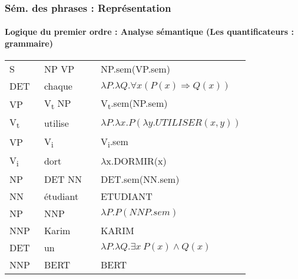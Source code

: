 \documentclass[xcolor=table]{beamer}
\begin{document}
\begin{frame}
	\frametitle{Sém. des phrases : Représentation}
	\framesubtitle{Logique du premier ordre : Analyse sémantique (Les quantificateurs : grammaire)}
	
	\begin{center}
		\small\bfseries
		\begin{tabular}{llll}
			\hline\hline
			S  & \textrightarrow\ NP VP && NP.sem(VP.sem) \\
			DET & \textrightarrow\ chaque && $\lambda P.\lambda Q.\forall x (P(x) \Rightarrow Q(x))$ \\
			
			VP & \textrightarrow\ V\textsubscript{t} NP && V\textsubscript{t}.sem(NP.sem) \\
			V\textsubscript{t}  & \textrightarrow\ utilise && $\lambda P.\lambda x.P(\lambda y.UTILISER(x, y))$ \\
			
			VP & \textrightarrow\ V\textsubscript{i} && V\textsubscript{i}.sem \\
			V\textsubscript{i}  & \textrightarrow\ dort && $ \lambda $x.DORMIR(x) \\
			
			NP & \textrightarrow\ DET NN && DET.sem(NN.sem) \\
			NN  & \textrightarrow\  étudiant && ETUDIANT \\
			
			NP & \textrightarrow\ NNP && $\lambda P.P(NNP.sem)$ \\
			NNP  & \textrightarrow\  Karim && KARIM \\
			
			DET & \textrightarrow\ un && $\lambda P.\lambda Q.\exists x\ P(x) \wedge Q(x)$ \\
			NNP  & \textrightarrow\  BERT && BERT \\
			\hline\hline
		\end{tabular}
	\end{center}

\end{frame}
\end{document}
